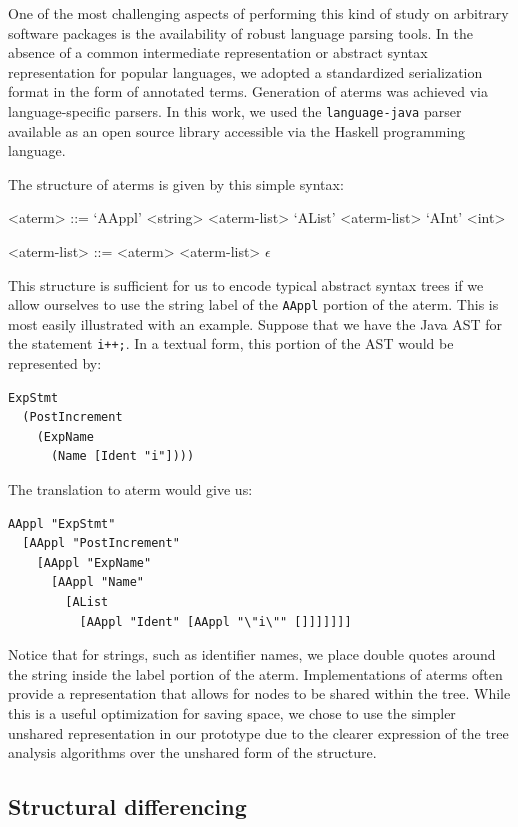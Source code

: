 One of the most challenging aspects of performing this kind of study on
arbitrary software packages is the availability of robust language parsing
tools.  In the absence of a common intermediate representation or abstract
syntax representation for popular languages, we adopted a standardized
serialization format in the form of annotated terms.  Generation of aterms was
achieved via language-specific parsers.  In this work, we used the
{\tt language-java} parser available as an open source library accessible via the
Haskell programming language.

The structure of aterms is given by this simple syntax:
\setlength{\grammarindent}{8em}
\begin{grammar}
<aterm> ::= `AAppl' <string> <aterm-list>
\alt `AList' <aterm-list>
\alt `AInt' <int>

<aterm-list> ::= <aterm> <aterm-list>
\alt $\epsilon$
\end{grammar}

This structure is sufficient for us to encode typical abstract syntax trees if
we allow ourselves to use the string label of the {\tt AAppl} portion of the
aterm. This is most easily illustrated with an example.  Suppose that we have
the Java AST for the statement {\tt i++;}.  In a textual form, this portion of
the AST would be represented by:

\begin{verbatim}
ExpStmt
  (PostIncrement
    (ExpName
      (Name [Ident "i"])))
\end{verbatim}

The translation to aterm would give us:

\begin{verbatim}
AAppl "ExpStmt"
  [AAppl "PostIncrement"
    [AAppl "ExpName"
      [AAppl "Name"
        [AList
          [AAppl "Ident" [AAppl "\"i\"" []]]]]]]
\end{verbatim}

Notice that for strings, such as identifier names, we place double quotes
around the string inside the label portion of the aterm. Implementations of
aterms often provide a representation that allows for nodes to be shared
within the tree. While this is a useful optimization for saving space, we
chose to use the simpler unshared representation in our prototype due to the
clearer expression of the tree analysis algorithms over the unshared form of
the structure.

\subsection{Structural differencing}

